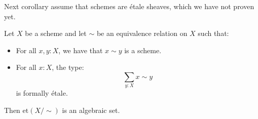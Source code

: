 Next corollary assume that schemes are étale sheaves, which we have not proven yet.

\begin{corollary}
Let $X$ be a scheme and let $\sim$ be an equivalence relation on $X$ such that:
\begin{itemize}
\item For all $x,y:X$, we have that $x\sim y$ is a scheme.
\item For all $x:X$, the type:
\[\sum_{y:X}x\sim y\]
is formally étale.
\end{itemize}
Then $\mathrm{et}(X/\sim)$ is an algebraic set.
\end{corollary}

